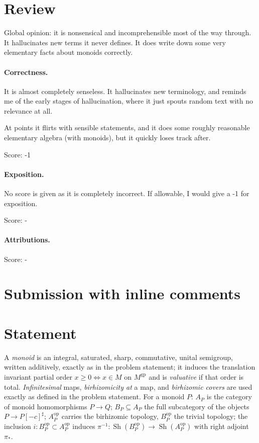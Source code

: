 \documentclass[11pt]{article}
\theoremstyle{definition}
\newcommand{\gp}{\mathrm{gp}}
\newcommand{\op}{\mathrm{op}}
\newcommand{\Sh}{\operatorname{Sh}}
\begin{document}
\maketitle

\section{Review}

Global opinion: it is nonsensical and incomprehensible most of the way through. It hallucinates new terms it never defines. It does write down some very elementary facts about monoids correctly.

\paragraph{Correctness.}
It is almost completely senseless. It hallucinates new terminology, and reminds me of the early stages of hallucination, where it just spouts random text with no relevance at all.

At points it flirts with sensible statements, and it does some roughly reasonable elementary algebra (with monoids), but it quickly loses track after.

\noindent Score: -1

\paragraph{Exposition.}
No score is given as it is completely incorrect. If allowable, I would give a -1 for exposition.

\noindent Score: -

\paragraph{Attributions.}
\noindent Score: -

\newpage
\section{Submission with inline comments}


\section{Statement}\label{sec:intro}

A \emph{monoid} is an integral, saturated, sharp, commutative, unital
semigroup, written additively, exactly as in the problem statement; it
induces the translation invariant partial order $x\ge0\iff x\in M$ on
$M^{\gp}$ and is \emph{valuative} if that order is total.
\emph{Infinitesimal} maps, \emph{birhizomicity at} a map, and
\emph{birhizomic covers} are used exactly as defined in the problem
statement. For a monoid $P$: $A_P$ is the category of monoid
homomorphisms $P\to Q$; $B_P\subseteq A_P$ the full subcategory of the
objects $P\to P[-c]^{\sharp}$; $A_P^{\op}$ carries the birhizomic
topology, $B_P^{\op}$ the trivial topology; the inclusion
$i:B_P^{\op}\subset A_P^{\op}$ induces
$\pi^{-1}:\Sh(B_P^{\op})\to\Sh(A_P^{\op})$ with right adjoint $\pi_{*}$.
\end{document}
